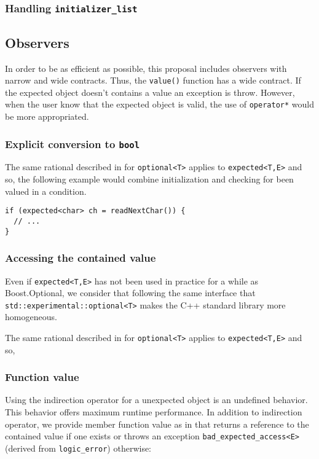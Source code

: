 \documentclass[a4paper,10pt]{article}
\newcommand{\cpp}[1]{\lstinline{#1}}
\begin{document}
\subsubsection{Handling \cpp{initializer_list}}

\subsection{Observers}

In order to be as efficient as possible, this proposal includes observers with narrow and wide contracts. Thus, the \cpp{value()} function has a wide contract. If the expected object doesn't contains a value an exception is throw. However, when the user know that the expected object is valid, the use of \cpp{operator*} would be more appropriated. 

\subsubsection{Explicit conversion to \cpp{bool}}

The same rational described in \cite{OptionalRev4} for \cpp{optional<T>} applies to \cpp{expected<T,E>} and so, the following example would combine initialization and  checking for been valued in a condition.

\begin{lstlisting}
if (expected<char> ch = readNextChar()) {
  // ...
}
\end{lstlisting}


\subsubsection{Accessing the contained value}

Even if \cpp{expected<T,E>} has not been used in practice for a while as Boost.Optional, we consider that following the same interface that \cpp{std::experimental::optional<T>} makes the C++ standard library more homogeneous. 

The same rational described in \cite{OptionalRev4} for \cpp{optional<T>} applies to \cpp{expected<T,E>} and so, 

\subsubsection{Function value}

Using the indirection operator for a unexpected object is an undefined behavior. This behavior offers maximum runtime performance. In addition to indirection operator, we provide member function value as in \cite{OptionalRev4} that returns a reference to the contained value if one exists or throws an exception \cpp{bad_expected_access<E>} (derived from \cpp{logic_error}) otherwise:
\end{document}
